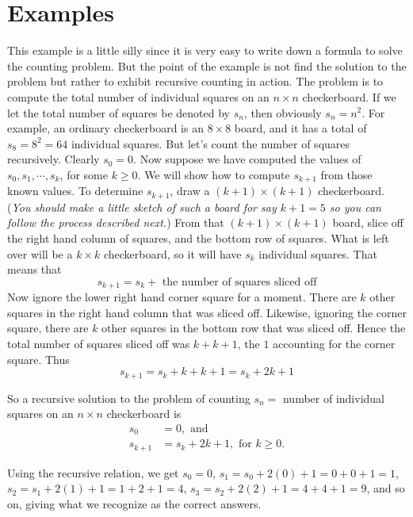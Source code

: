 \section{Examples}
\begin{exmp}
 This example is a little
 silly since it is very easy to write down a formula to solve the counting
 problem. But the point of the example is not find the solution to the problem but
 rather  to exhibit recursive counting in action. The problem is to compute the
 total number of individual squares on an $n\times n$ checkerboard. If we let the
 total number of squares be denoted by $s_n$, then obviously $s_n=n^2$. For
 example, an ordinary checkerboard is an $8\times8$ board, and it has a total of
 $s_8= 8^2 = 64$ individual squares. But let's count the number of squares
 recursively. Clearly $s_0 = 0$. Now suppose we have computed the values of $s_0,
 s_1, \cdots,s_k$, for some $k\geq0$. We will show how to compute $s_{k+1}$ from
 those known values. To determine $s_{k+1}$, draw a $(k+1)\times(k+1)$
 checkerboard. ({\itshape You should make a little sketch of such a
 board for say $k+1 = 5$ so you can follow the process described next.}) 
 From that $(k+1)\times(k+1)$
 board, slice off the right hand column of squares, and the bottom row of squares.
 What is left over will be a $k\times k$ checkerboard, so it will have $s_k$
 individual squares. That means that 
 $$
 s_{k+1} = s_k + \text{ the number of squares sliced off}
 $$
 Now ignore the lower right hand corner square for a moment. There are $k$ other
 squares in the right hand column that was sliced off. Likewise, ignoring the
 corner square, there are $k$ other
 squares in the bottom row that was sliced off. Hence the total number of squares
 sliced off was $k+k+1$, the $1$ accounting for the corner square. Thus
 $$
 s_{k+1} = s_k + k+k + 1 = s_k+2k+1
 $$
 
 So a recursive solution to the problem of counting $s_n=$ number of individual
 squares on an $n\times n$ checkerboard is
 \begin{align*}
  s_0&=0, \text{ and} \\
  s_{k+1} &=  s_k+2k+1, \text{ for $k\geq0$.}
 \end{align*}
 
 Using the recursive relation, we get $s_0=0$, $s_1 = s_0+2(0)+1 =0+0+1=1$,
 $s_2 = s_1+2(1)+1 = 1+2+1 = 4$, $s_3 = s_2+2(2)+1 = 4+4+1 = 9$, and so on, giving
 what we recognize as the correct answers.
\end{exmp}


